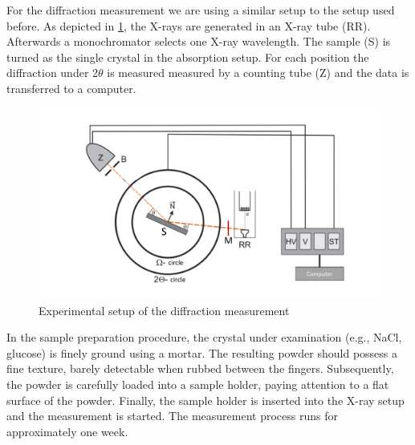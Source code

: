 For the diffraction measurement we are using a similar setup to the setup used before. As depicted in \cref{fig:setupdiff}, the X-rays are generated in an X-ray tube (RR). Afterwards a monochromator selects one X-ray wavelength. 
The sample (S) is turned as the single crystal in the absorption setup. For each position the diffraction under 2$\theta$ is measured measured by a counting tube (Z) and the data is transferred to a computer.

\begin{figure}[h]
    \centering
    \includegraphics[width = \textwidth]{Bilder/Setup/SetupDiff.pdf}
    \caption{Experimental setup of the diffraction measurement}
    \label{fig:setupdiff}
\end{figure}

In the sample preparation procedure, the crystal under examination (e.g., NaCl, glucose) is finely ground using a mortar. The resulting powder should possess a fine texture, barely detectable when rubbed between the fingers. Subsequently, the powder is carefully loaded into a sample holder, paying attention to a flat surface of the powder. Finally, the sample holder is inserted into the X-ray setup and the measurement is started. The measurement process runs for
approximately one week.